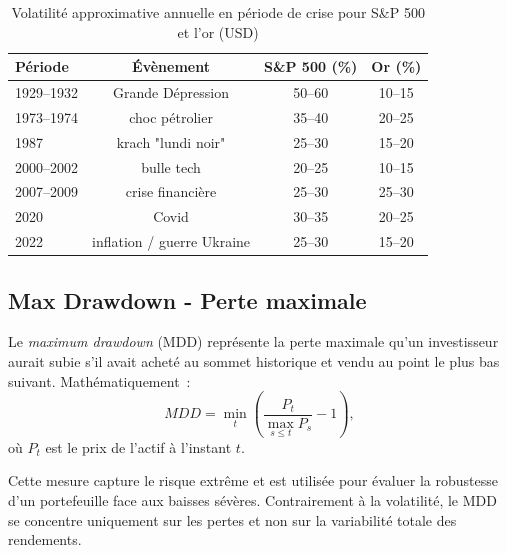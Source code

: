 \documentclass[12pt,a4paper]{article}
\begin{document}
\begin{table}[h!]
\centering
\begin{tabular}{lccc}
\toprule
Période & Évènement &S\&P 500 (\%) & Or (\%) \\
\midrule
1929--1932  & Grande Dépression             & 50--60  & 10--15 \\
1973--1974  & choc pétrolier                & 35--40  & 20--25 \\
1987        & krach "lundi noir"            & 25--30  & 15--20 \\
2000--2002  & bulle tech                    & 20--25  & 10--15 \\
2007--2009  & crise financière              & 25--30  & 25--30 \\
2020        & Covid                         & 30--35  & 20--25 \\
2022        & inflation / guerre Ukraine    & 25--30  & 15--20 \\
\bottomrule
\end{tabular}
\caption{Volatilité approximative annuelle en période de crise pour S\&P 500 et l'or (USD)}
\label{tab:volatility_crises}
\end{table}


\subsection{Max Drawdown - Perte maximale}

Le \emph{maximum drawdown} (MDD) représente la perte maximale qu'un 
investisseur aurait subie s'il avait acheté au sommet historique et vendu
au point le plus bas suivant. Mathématiquement~:
\begin{equation}
    MDD = \min_t \left(\frac{P_t}{\max_{s\le t} P_s} - 1\right),
\end{equation}
où $P_t$ est le prix de l'actif à l'instant $t$.

Cette mesure capture le risque extrême et est utilisée pour évaluer la
robustesse d'un portefeuille face aux baisses sévères. Contrairement à la
volatilité, le MDD se concentre uniquement sur les pertes et non sur la
variabilité totale des rendements.
\end{document}
